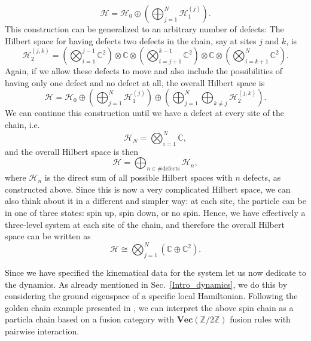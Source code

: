 \documentclass[aps,prb,twocolumn,superscriptaddress,noshowkeys]{revtex4-2}  %
\renewcommand{\Vec}{\textbf{Vec}}
\newcommand{\Z}{\mathbb{Z}}
\theoremstyle{plain}%
\theoremstyle{definition}
\theoremstyle{remark}
\begin{document}
\begin{equation}
	\mathcal{H}=\mathcal{H}_0\oplus\left(\bigoplus_{j=1}^N\mathcal{H}_1^{(j)}\right).
\end{equation}
This construction can be generalized to an arbitrary number of defects: The Hilbert space for having defects two defects in the chain, say at sites $j$ and $k$, is 
\begin{equation}
	\mathcal{H}_2^{(j,k)}=\left(\bigotimes_{i=1}^{j-1}\mathbb{C}^2\right)\otimes\mathbb{C}\otimes\left(\bigotimes_{i=j+1}^{k-1}\mathbb{C}^2\right)\otimes\mathbb{C}\otimes\left(\bigotimes_{i=k+1}^{N}\mathbb{C}^2\right).
\end{equation}
Again, if we allow these defects to move and also include the possibilities of having only one defect and no defect at all, the overall Hilbert space is
\begin{equation}
	\mathcal{H}=\mathcal{H}_0\oplus\left(\bigoplus_{j=1}^N\mathcal{H}_1^{(j)}\right)\oplus\left(\bigoplus_{j=1}^N\bigoplus_{k\neq j}\mathcal{H}_2^{(j,k)}\right).
\end{equation}
We can continue this construction until we have a defect at every site of the chain, i.e.
\begin{equation}
	\mathcal{H}_N=\bigotimes_{i=1}^N\mathbb{C},
\end{equation}
and the overall Hilbert space is then
\begin{equation}
	\mathcal{H}=\bigoplus_{n\in\#\mathrm{defects}}\mathcal{H}_n,
\end{equation}
where $\mathcal{H}_n$ is the direct sum of all possible Hilbert spaces with $n$ defects, as constructed above. Since this is now a very complicated Hilbert space, we can also think about it in a different and simpler way: at each site, the particle can be in one of three states: spin up, spin down, or no spin. Hence, we have effectively a three-level system at each site of the chain, and therefore the overall Hilbert space can be written as
\begin{equation}
	\mathcal{H}\cong\bigotimes_{j=1}^N\left(\mathbb{C}\oplus\mathbb{C}^2\right).
\end{equation}

Since we have specified the kinematical data for the system let us now dedicate to the dynamics. As already mentioned in Sec.~\ref{Intro_dynamics}, we do this by considering the ground eigenspace of a specific local Hamiltonian. Following the golden chain example presented in \cite{Feiguin2007}, we can interpret the above spin chain as a particla chain based on a fusion category with $\Vec(\Z/2\Z)$ fusion rules with pairwise interaction.
\end{document}
